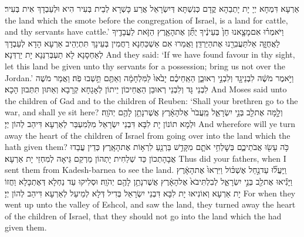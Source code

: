 {אַרְעָא דִּמְחָא יְיָ יָת יָתְבַהָא קֳדָם כְּנִשְׁתָּא דְּיִשְׂרָאֵל אֲרַע כָּשְׁרָא לְבֵית בְּעִיר הִיא וּלְעַבְדָךְ אִית בְּעִיר׃}
{the land which the \lord\space smote before the congregation of Israel, is a land for cattle, and thy servants have cattle.’}{}
{וַיֹּאמְר֗וּ אִם\maqqaf מָצָ֤אנוּ חֵן֙ בְּעֵינֶ֔יךָ יֻתַּ֞ן אֶת\maqqaf הָאָ֧רֶץ הַזֹּ֛את לַעֲבָדֶ֖יךָ לַאֲחֻזָּ֑ה אַל\maqqaf תַּעֲבִרֵ֖נוּ אֶת\maqqaf הַיַּרְדֵּֽן׃}
{וַאֲמַרוּ אִם אַשְׁכַּחְנָא רַחֲמִין בְּעֵינָךְ תִּתְיְהֵיב אַרְעָא הָדָא לְעַבְדָךְ לְאַחְסָנָא לָא תַעְבְּרִנַּנָא יָת יַרְדְּנָא׃}
{And they said: ‘If we have found favour in thy sight, let this land be given unto thy servants for a possession; bring us not over the Jordan.’}{}
{וַיֹּ֣אמֶר מֹשֶׁ֔ה לִבְנֵי\maqqaf גָ֖ד וְלִבְנֵ֣י רְאוּבֵ֑ן הַאַֽחֵיכֶ֗ם יָבֹ֙אוּ֙ לַמִּלְחָמָ֔ה וְאַתֶּ֖ם תֵּ֥שְׁבוּ פֹֽה׃}
{וַאֲמַר מֹשֶׁה לִבְנֵי גָּד וְלִבְנֵי רְאוּבֵן הַאֲחֵיכוֹן יֵיתוֹן לְאָגָחָא קְרָבָא וְאַתּוּן תִּתְּבוּן הָכָא׃}
{And Moses said unto the children of Gad and to the children of Reuben: ‘Shall your brethren go to the war, and shall ye sit here?}{}
{וְלָ֣מָּה  אֶת\maqqaf לֵ֖ב בְּנֵ֣י יִשְׂרָאֵ֑ל מֵֽעֲבֹר֙ אֶל\maqqaf הָאָ֔רֶץ אֲשֶׁר\maqqaf נָתַ֥ן לָהֶ֖ם יְהֹוָֽה׃}
{וּלְמָא תוֹנוֹן יָת לִבָּא דִּבְנֵי יִשְׂרָאֵל מִלְּמִעְבַּר לְאַרְעָא דִּיהַב לְהוֹן יְיָ׃}
{And wherefore will ye turn away the heart of the children of Israel from going over into the land which the \lord\space hath given them?}{}
{כֹּ֥ה עָשׂ֖וּ אֲבֹתֵיכֶ֑ם בְּשׇׁלְחִ֥י אֹתָ֛ם מִקָּדֵ֥שׁ בַּרְנֵ֖עַ לִרְא֥וֹת אֶת\maqqaf הָאָֽרֶץ׃}
{כְּדֵין עֲבַדוּ אֲבָהָתְכוֹן כַּד שְׁלַחִית יָתְהוֹן מֵרְקַם גֵּיאָה לְמִחְזֵי יָת אַרְעָא׃}
{Thus did your fathers, when I sent them from Kadesh-barnea to see the land.}{}
{וַֽיַּעֲל֞וּ עַד\maqqaf נַ֣חַל אֶשְׁכּ֗וֹל וַיִּרְאוּ֙ אֶת\maqqaf הָאָ֔רֶץ וַיָּנִ֕יאוּ אֶת\maqqaf לֵ֖ב בְּנֵ֣י יִשְׂרָאֵ֑ל לְבִלְתִּי\maqqaf בֹא֙ אֶל\maqqaf הָאָ֔רֶץ אֲשֶׁר\maqqaf נָתַ֥ן לָהֶ֖ם יְהֹוָֽה׃}
{וּסְלִיקוּ עַד נַחְלָא דְּאֶתְכָּלָא וַחֲזוֹ יָת אַרְעָא וְאוֹנִיאוּ יָת לִבָּא דִּבְנֵי יִשְׂרָאֵל בְּדִיל דְּלָא לְמֵיעַל לְאַרְעָא דִּיהַב לְהוֹן יְיָ׃}
{For when they went up unto the valley of Eshcol, and saw the land, they turned away the heart of the children of Israel, that they should not go into the land which the \lord\space had given them.}{}
